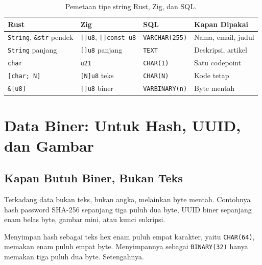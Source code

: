 \documentclass[11pt,a4paper]{article}
\begin{document}
\begin{table}[H]
	\centering
	\caption{Pemetaan tipe string Rust, Zig, dan SQL.}
	\label{tab:str}
	\small
	\begin{tabular}{l l l l}
		\toprule
		Rust                                   & Zig                                & SQL                   & Kapan Dipakai      \\
		\midrule
		\texttt{String}, \texttt{\&str} pendek & \texttt{[]u8}, \texttt{[]const u8} & \texttt{VARCHAR(255)} & Nama, email, judul \\
		\texttt{String} panjang                & \texttt{[]u8} panjang              & \texttt{TEXT}         & Deskripsi, artikel \\
		\texttt{char}                          & \texttt{u21}                       & \texttt{CHAR(1)}      & Satu codepoint     \\
		\texttt{[char; N]}                     & \texttt{[N]u8} teks                & \texttt{CHAR(N)}      & Kode tetap         \\
		\texttt{\&[u8]}                        & \texttt{[]u8} biner                & \texttt{VARBINARY(n)} & Byte mentah        \\
		\bottomrule
	\end{tabular}
\end{table}

\section{Data Biner: Untuk Hash, UUID, dan Gambar}

\subsection{Kapan Butuh Biner, Bukan Teks}

Terkadang data bukan teks, bukan angka, melainkan byte mentah. Contohnya hash password SHA-256 sepanjang tiga puluh dua byte, UUID biner sepanjang enam belas byte, gambar mini, atau kunci enkripsi.

Menyimpan hash sebagai teks hex enam puluh empat karakter, yaitu \texttt{CHAR(64)}, memakan enam puluh empat byte. Menyimpannya sebagai \texttt{BINARY(32)} hanya memakan tiga puluh dua byte. Setengahnya.
\end{document}
